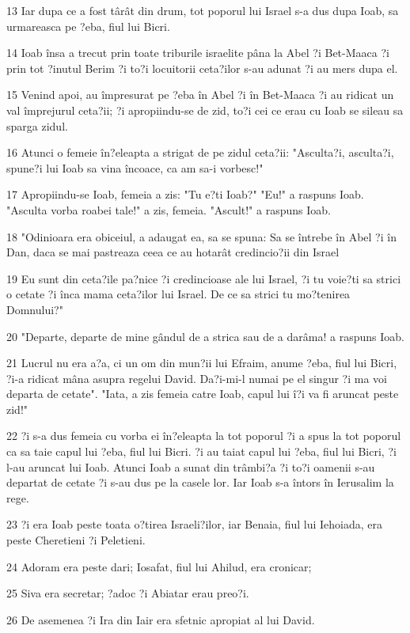\par 13 Iar dupa ce a fost târât din drum, tot poporul lui Israel s-a dus dupa Ioab, sa urmareasca pe ?eba, fiul lui Bicri.
\par 14 Ioab însa a trecut prin toate triburile israelite pâna la Abel ?i Bet-Maaca ?i prin tot ?inutul Berim ?i to?i locuitorii ceta?ilor s-au adunat ?i au mers dupa el.
\par 15 Venind apoi, au împresurat pe ?eba în Abel ?i în Bet-Maaca ?i au ridicat un val împrejurul ceta?ii; ?i apropiindu-se de zid, to?i cei ce erau cu Ioab se sileau sa sparga zidul.
\par 16 Atunci o femeie în?eleapta a strigat de pe zidul ceta?ii: "Asculta?i, asculta?i, spune?i lui Ioab sa vina încoace, ca am sa-i vorbesc!"
\par 17 Apropiindu-se Ioab, femeia a zis: "Tu e?ti Ioab?" "Eu!" a raspuns Ioab. "Asculta vorba roabei tale!" a zis, femeia. "Ascult!" a raspuns Ioab.
\par 18 "Odinioara era obiceiul, a adaugat ea, sa se spuna: Sa se întrebe în Abel ?i în Dan, daca se mai pastreaza ceea ce au hotarât credincio?ii din Israel
\par 19 Eu sunt din ceta?ile pa?nice ?i credincioase ale lui Israel, ?i tu voie?ti sa strici o cetate ?i înca mama ceta?ilor lui Israel. De ce sa strici tu mo?tenirea Domnului?"
\par 20 "Departe, departe de mine gândul de a strica sau de a darâma! a raspuns Ioab.
\par 21 Lucrul nu era a?a, ci un om din mun?ii lui Efraim, anume ?eba, fiul lui Bicri, ?i-a ridicat mâna asupra regelui David. Da?i-mi-l numai pe el singur ?i ma voi departa de cetate". "Iata, a zis femeia catre Ioab, capul lui î?i va fi aruncat peste zid!"
\par 22 ?i s-a dus femeia cu vorba ei în?eleapta la tot poporul ?i a spus la tot poporul ca sa taie capul lui ?eba, fiul lui Bicri. ?i au taiat capul lui ?eba, fiul lui Bicri, ?i l-au aruncat lui Ioab. Atunci Ioab a sunat din trâmbi?a ?i to?i oamenii s-au departat de cetate ?i s-au dus pe la casele lor. Iar Ioab s-a întors în Ierusalim la rege.
\par 23 ?i era Ioab peste toata o?tirea Israeli?ilor, iar Benaia, fiul lui Iehoiada, era peste Cheretieni ?i Peletieni.
\par 24 Adoram era peste dari; Iosafat, fiul lui Ahilud, era cronicar;
\par 25 Siva era secretar; ?adoc ?i Abiatar erau preo?i.
\par 26 De asemenea ?i Ira din Iair era sfetnic apropiat al lui David.

